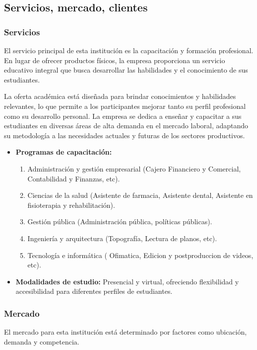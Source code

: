 \subsection{Servicios, mercado, clientes}
\subsubsection{Servicios}
El servicio principal de esta institución es la capacitación y formación profesional. En lugar de ofrecer productos físicos, la empresa proporciona un servicio educativo integral que busca desarrollar las habilidades y el conocimiento de sus estudiantes.

La oferta académica está diseñada para brindar conocimientos y habilidades relevantes, lo que permite a los participantes mejorar tanto su perfil profesional como su desarrollo personal. La empresa se dedica a enseñar y capacitar a sus estudiantes en diversas áreas de alta demanda en el mercado laboral, adaptando su metodología a las necesidades actuales y futuras de los sectores productivos.

\begin{itemize}
	\item \textbf{Programas de capacitación:}
	
	\begin{enumerate}
		\item Administración y gestión empresarial (Cajero Financiero y Comercial, Contabilidad y Finanzas, etc).
		\item Ciencias de la salud (Asistente de farmacia, Asistente dental, Asistente en fisioterapia y rehabilitación).
		\item Gestión pública (Administración pública, políticas públicas).
		\item Ingeniería y arquitectura (Topografía, Lectura de planos, etc).
		\item Tecnología e informática ( Ofimatica, Edicion y postproduccion de videos, etc).
	\end{enumerate}
	
	
	\item \textbf{Modalidades de estudio:} Presencial y virtual, ofreciendo flexibilidad y accesibilidad para diferentes perfiles de estudiantes.
\end{itemize}
\newpage
\subsubsection{Mercado}
El mercado para esta institución está determinado por factores como ubicación, demanda y competencia.

